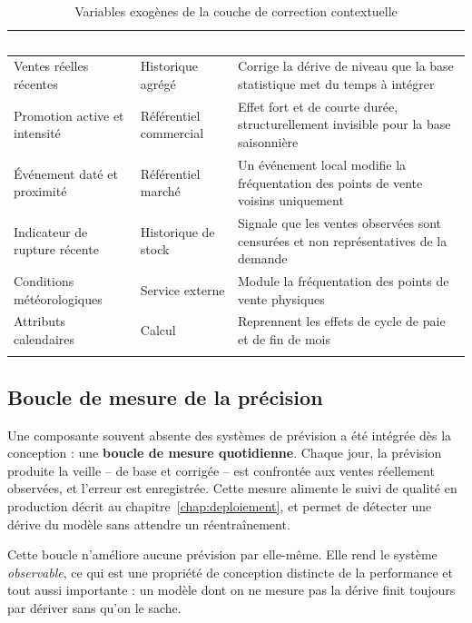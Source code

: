 \begingroup
\setlength{\tabcolsep}{3pt}
\renewcommand{\arraystretch}{1.15}
\small

\begin{longtable}{|P{3.4cm}|P{4.0cm}|P{6.1cm}|}
\hline
{}
\textcolor{white}{\textbf{Variable}} &
\textcolor{white}{\textbf{Source}} &
\textcolor{white}{\textbf{Justification}} \\
\hline
\endhead
\hline
\endfoot
\hline
\endlastfoot
Ventes réelles récentes & Historique agrégé & Corrige la dérive de niveau que la base statistique met du temps à intégrer \\
\hline
Promotion active et intensité & Référentiel commercial & Effet fort et de courte durée, structurellement invisible pour la base saisonnière \\
\hline
Événement daté et proximité & Référentiel marché & Un événement local modifie la fréquentation des points de vente voisins uniquement \\
\hline
Indicateur de rupture récente & Historique de stock & Signale que les ventes observées sont censurées et non représentatives de la demande \\
\hline
Conditions météorologiques & Service externe & Module la fréquentation des points de vente physiques \\
\hline
Attributs calendaires & Calcul & Reprennent les effets de cycle de paie et de fin de mois \\
\hline
\caption{Variables exogènes de la couche de correction contextuelle}
\label{tab:exogenes-chap4}
\end{longtable}
\endgroup

\subsection{Boucle de mesure de la précision}

Une composante souvent absente des systèmes de prévision a été intégrée dès la conception : une \textbf{boucle de mesure quotidienne}. Chaque jour, la prévision produite la veille -- de base et corrigée -- est confrontée aux ventes réellement observées, et l'erreur est enregistrée. Cette mesure alimente le suivi de qualité en production décrit au chapitre~\ref{chap:deploiement}, et permet de détecter une dérive du modèle sans attendre un réentraînement.

Cette boucle n'améliore aucune prévision par elle-même. Elle rend le système \textit{observable}, ce qui est une propriété de conception distincte de la performance et tout aussi importante : un modèle dont on ne mesure pas la dérive finit toujours par dériver sans qu'on le sache.

